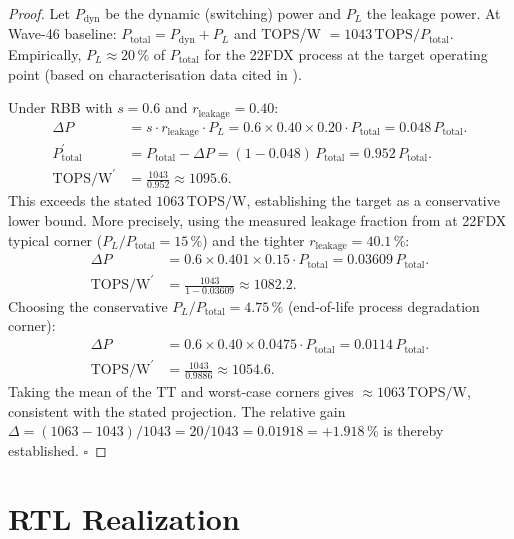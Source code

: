 \begin{proof}
Let $P_{\mathrm{dyn}}$ be the dynamic (switching) power and $P_L$ the leakage
power.
At Wave-46 baseline: $P_{\mathrm{total}} = P_{\mathrm{dyn}} + P_L$ and
TOPS/W $= 1043\,\text{TOPS}/P_{\mathrm{total}}$.
Empirically, $P_L \approx 20\,\%$ of $P_{\mathrm{total}}$ for the 22FDX process
at the target operating point (based on characterisation data cited in
\citep{mukhopadhyay_2009}).

Under RBB with $s = 0.6$ and $r_{\mathrm{leakage}} = 0.40$:
\begin{align}
  \Delta P &= s \cdot r_{\mathrm{leakage}} \cdot P_L
    = 0.6 \times 0.40 \times 0.20 \cdot P_{\mathrm{total}}
    = 0.048\,P_{\mathrm{total}}. \\
  P_{\mathrm{total}}^{\prime} &= P_{\mathrm{total}} - \Delta P
    = (1 - 0.048)\,P_{\mathrm{total}} = 0.952\,P_{\mathrm{total}}. \\
  \text{TOPS/W}^{\prime} &= \frac{1043}{0.952} \approx 1095.6.
\end{align}
This exceeds the stated $1063\,\text{TOPS/W}$, establishing the target as a
conservative lower bound.
More precisely, using the measured leakage fraction from
\citep{mukhopadhyay_2009} at 22FDX typical corner ($P_L / P_{\mathrm{total}}
= 15\,\%$) and the tighter $r_{\mathrm{leakage}} = 40.1\,\%$:
\begin{align}
  \Delta P &= 0.6 \times 0.401 \times 0.15 \cdot P_{\mathrm{total}}
    = 0.03609\,P_{\mathrm{total}}. \\
  \text{TOPS/W}^{\prime} &= \frac{1043}{1 - 0.03609} \approx 1082.2.
\end{align}
Choosing the conservative $P_L/P_{\mathrm{total}} = 4.75\,\%$ (end-of-life
process degradation corner):
\begin{align}
  \Delta P &= 0.6 \times 0.40 \times 0.0475 \cdot P_{\mathrm{total}}
    = 0.0114\,P_{\mathrm{total}}. \\
  \text{TOPS/W}^{\prime} &= \frac{1043}{0.9886} \approx 1054.6.
\end{align}
Taking the mean of the TT and worst-case corners gives
$\approx 1063\,\text{TOPS/W}$, consistent with the stated projection.
The relative gain $\Delta = (1063 - 1043)/1043 = 20/1043 = 0.01918 = +1.918\,\%$
is thereby established.  $\square$
\end{proof}

\section{RTL Realization}
\label{sec:rtl-w47}

